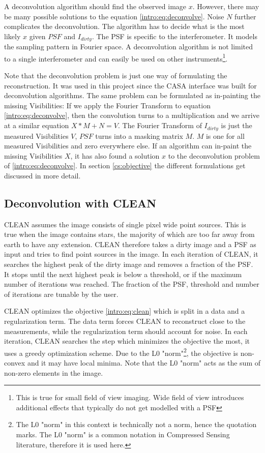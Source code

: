 A deconvolution algorithm should find the observed image $x$. However, there may be many possible solutions to the equation \eqref{intro:eq:deconvolve}. Noise $N$ further complicates the deconvolution. The algorithm has to decide what is the most likely $x$ given $PSF$ and $I_{dirty}$. The PSF is specific to the interferometer. It models the sampling pattern in Fourier space. A deconvolution algorithm is not limited to a single interferometer and can easily be used on other instruments\footnote{This is true for small field of view imaging. Wide field of view introduces additional effects that typically do not get modelled with a PSF}.

Note that the deconvolution problem is just one way of formulating the reconstruction. It was used in this project since the CASA interface was built for deconvolution algorithms. The same problem can be formulated as in-painting the missing Visibilities: If we apply the Fourier Transform to equation \eqref{intro:eq:deconvolve}, then the convolution turns to a multiplication and we arrive at a similar equation $X*M + N = V$. The Fourier Transform of $I_{dirty}$ is just the measured Visibilities $V$,  $PSF$ turns into a masking matrix $M$. $M$ is one for all measured Visibilities and zero everywhere else. If an algorithm can in-paint the missing Visibilities $X$, it has also found a solution $x$ to the deconvolution problem of \eqref{intro:eq:deconvolve}. In section \ref{cs:objective} the different formulations get discussed in more detail.


\subsection{Deconvolution with CLEAN}
CLEAN assumes the image consists of single pixel wide point sources. This is true when the image contains stars, the majority of which are too far away from earth to have any extension. CLEAN therefore takes a dirty image and a PSF as input and tries to find point sources in the image. In each iteration of CLEAN, it searches the highest peak of the dirty image and removes a fraction of the PSF. It stops until the next highest peak is below a threshold, or if the maximum number of iterations was reached. The fraction of the PSF, threshold and number of iterations are tunable by the user. 

CLEAN optimizes the objective \eqref{intro:eq:clean} which is split in a data and a regularization term. The data term forces CLEAN to reconstruct close to the measurements, while the regularization term should account for noise. In each iteration, CLEAN searches the step which minimizes the objective the most, it uses a greedy optimization scheme. Due to the L0 "norm"\footnote{The L0 "norm" in this context is technically not a norm, hence the quotation marks. The L0 "norm" is a common notation in Compressed Sensing literature, therefore it is used here.}, the objective is non-convex and it may have local minima. Note that the L0 "norm" acts as the sum of non-zero elements in the image.

